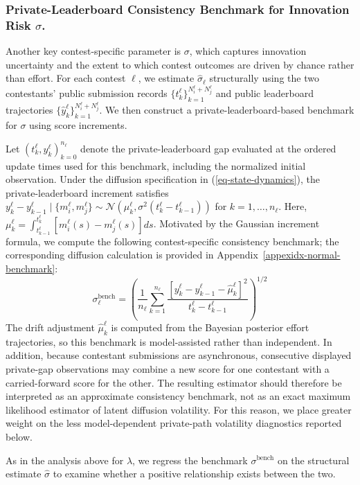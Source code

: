 \documentclass[mnsc]{informs3}
\begin{document}
\subsubsection{Private-Leaderboard Consistency Benchmark for Innovation Risk $\sigma$.}
Another key contest-specific parameter is $\sigma$, which captures innovation uncertainty and the extent to which contest outcomes are driven by chance rather than effort.
For each contest $\ell$, we estimate $\hat{\sigma}_\ell$ structurally using the two contestants’ public submission records $\{t_k^\ell\}_{k=1}^{N_i^\ell+N_j^\ell}$ and public leaderboard trajectories $\{\hat y_k^\ell\}_{k=1}^{N_i^\ell+N_j^\ell}$.
We then construct a private-leaderboard-based benchmark for $\sigma$ using score increments.

Let $(t^\ell_k,y^\ell_k)_{k=0}^{n_\ell}$ denote the private-leaderboard gap evaluated at the ordered update times used for this benchmark, including the normalized initial observation.
Under the diffusion specification in (\ref{eq-state-dynamics}), the private-leaderboard increment satisfies
$y^\ell_{k} - y^\ell_{k-1} \mid \{m_i^\ell,m_j^\ell\} \sim \mathcal{N}\left(\mu^\ell_k, \sigma^2(t^\ell_k-t^\ell_{k-1})\right)$ for $k=1,\ldots,n_\ell$.
Here, $\mu^\ell_k = \int^{t^\ell_k}_{t^\ell_{k-1}}\left[m^\ell_i(s) - m^\ell_j(s)\right]ds$.
Motivated by the Gaussian increment formula, we compute the following contest-specific consistency benchmark; the corresponding diffusion calculation is provided in Appendix~\ref{appexidx-normal-benchmark}:
\begin{equation*}
\sigma^{\text{bench}}_\ell = \left(\frac{1}{n_\ell}\sum_{k=1}^{n_\ell}\frac{\left[y^\ell_k-y^\ell_{k-1}-\hat\mu^\ell_k\right]^2}{t^\ell_k-t^\ell_{k-1}}\right)^{1/2}
\end{equation*}
The drift adjustment $\hat\mu_k^\ell$ is computed from the Bayesian posterior effort trajectories, so this benchmark is model-assisted rather than independent. In addition, because contestant submissions are asynchronous, consecutive displayed private-gap observations may combine a new score for one contestant with a carried-forward score for the other. The resulting estimator should therefore be interpreted as an approximate consistency benchmark, not as an exact maximum likelihood estimator of latent diffusion volatility. For this reason, we place greater weight on the less model-dependent private-path volatility diagnostics reported below.

As in the analysis above for $\lambda$, we regress the benchmark $\sigma^{\text{bench}}$ on the structural estimate $\hat{\sigma}$ to examine whether a positive relationship exists between the two.
\end{document}
